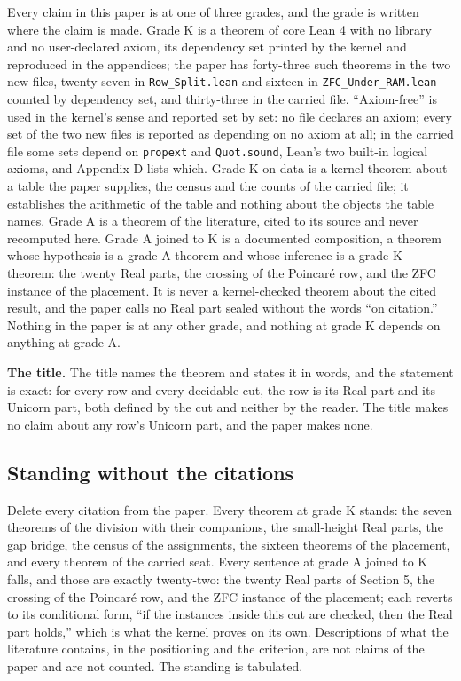 \documentclass[10pt]{article}
\begin{document}
Every claim in this paper is at one of three grades, and the grade is
written where the claim is made. Grade K is a theorem of core Lean 4
with no library and no user-declared axiom, its dependency set printed
by the kernel and reproduced in the appendices; the paper has
forty-three such theorems in the two new files, twenty-seven in
\texttt{Row\_Split.lean} and sixteen in \texttt{ZFC\_Under\_RAM.lean}
counted by dependency set, and thirty-three in the carried file.
``Axiom-free'' is used in the kernel's sense and reported set by set: no
file declares an axiom; every set of the two new files is reported as
depending on no axiom at all; in the carried file some sets depend on
\texttt{propext} and \texttt{Quot.sound}, Lean's two built-in logical
axioms, and Appendix D lists which. Grade K on data is a kernel theorem
about a table the paper supplies, the census and the counts of the
carried file; it establishes the arithmetic of the table and nothing
about the objects the table names. Grade A is a theorem of the
literature, cited to its source and never recomputed here. Grade A
joined to K is a documented composition, a theorem whose hypothesis is a
grade-A theorem and whose inference is a grade-K theorem: the twenty
Real parts, the crossing of the Poincaré row, and the ZFC instance of
the placement. It is never a kernel-checked theorem about the cited
result, and the paper calls no Real part sealed without the words ``on
citation.'' Nothing in the paper is at any other grade, and nothing at
grade K depends on anything at grade A.

\textbf{The title.} The title names the theorem and states it in words,
and the statement is exact: for every row and every decidable cut, the
row is its Real part and its Unicorn part, both defined by the cut and
neither by the reader. The title makes no claim about any row's Unicorn
part, and the paper makes none.

\hypertarget{standing-without-the-citations}{%
\subsection{Standing without the
citations}\label{standing-without-the-citations}}

Delete every citation from the paper. Every theorem at grade K stands:
the seven theorems of the division with their companions, the
small-height Real parts, the gap bridge, the census of the assignments,
the sixteen theorems of the placement, and every theorem of the carried
seat. Every sentence at grade A joined to K falls, and those are exactly
twenty-two: the twenty Real parts of Section 5, the crossing of the
Poincaré row, and the ZFC instance of the placement; each reverts to its
conditional form, ``if the instances inside this cut are checked, then
the Real part holds,'' which is what the kernel proves on its own.
Descriptions of what the literature contains, in the positioning and the
criterion, are not claims of the paper and are not counted. The standing
is tabulated.
\end{document}
